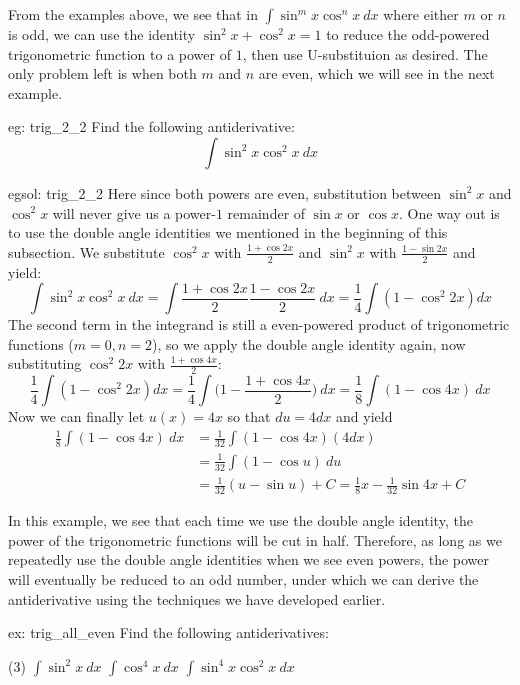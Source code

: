 From the examples above, we see that in $\int \sin^mx \cos^nx~dx$ where either $m$ or $n$ is odd, we can use the identity $\sin^2x+\cos^2x = 1$ to reduce the odd-powered trigonometric function to a power of $1$, then use U-substituion as desired.  The only problem left is when both $m$ and $n$ are even, which we will see in the next example. 
\begin{eg}[]{eg: trig_2_2}
Find the following antiderivative:
\[\int \sin^2 x \cos^2 x~dx\]
\end{eg}
\begin{egsol}[]{egsol: trig_2_2}
    Here since both powers are even, substitution between $\sin^2x$ and $\cos^2x$ will never give us a power-$1$ remainder of $\sin x$ or $\cos x$.  One way out is to use the double angle identities we mentioned in the beginning of this subsection.  We substitute $\cos^2x$ with $\frac{1+\cos 2x}{2}$ and $\sin^2x$ with $\frac{1-\sin 2x}{2}$ and yield:
    \begin{equation*}
        \int \sin^2x \cos^2x~dx = \int \frac{1+\cos 2x}{2}\frac{1-\cos 2x}{2}~dx = \frac{1}{4}\int (1-\cos^2 2x) dx
    \end{equation*}
    The second term in the integrand is still a even-powered product of trigonometric functions ($m = 0, n = 2$), so we apply the double angle identity again, now substituting $\cos^2 2x$ with $\frac{1+\cos 4x}{2}$:
    \[\frac{1}{4}\int (1-\cos^2 2x) dx = \frac{1}{4}\int \Big(1-\frac{1+\cos 4x}{2}\Big)~dx = \frac{1}{8}\int (1-\cos 4x)~dx\]
    Now we can finally let $u(x) = 4x$ so that $du = 4 dx$ and yield
    \begin{align*}
        \frac{1}{8}\int (1-\cos 4x)~dx &= \frac{1}{32}\int (1-\cos 4x)(4dx)\\
        &= \frac{1}{32}\int (1-\cos u)~du \\
        &= \frac{1}{32}(u-\sin u) + C = \frac{1}{8}x - \frac{1}{32}\sin 4x + C
    \end{align*}
\end{egsol}
In this example, we see that each time we use the double angle identity, the power of the trigonometric functions will be cut in half.  Therefore, as long as we repeatedly use the double angle identities when we see even powers, the power will eventually be reduced to an odd number, under which we can derive the antiderivative using the techniques we have developed earlier.
\begin{ex}[]{ex: trig_all_even}
Find the following antiderivatives:
    \begin{tasks}(3)
        \task $\int \sin^2x~dx$
        \task $\int \cos^4x~dx$
        \task $\int \sin^4x \cos^2x~dx$
    \end{tasks}
\end{ex}
